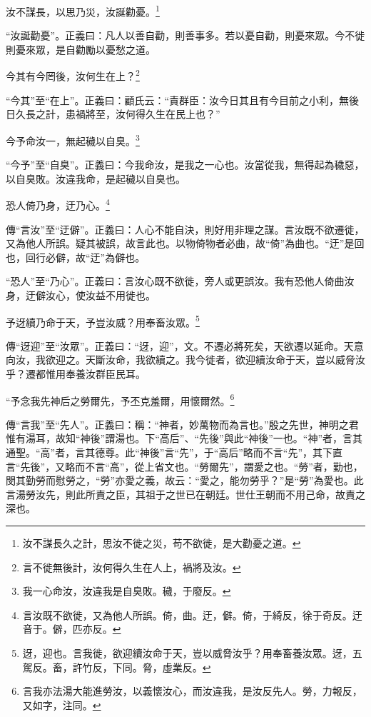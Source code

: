 汝不謀長，以思乃災，汝誕勸憂。\footnote{汝不謀長久之計，思汝不徙之災，苟不欲徙，是大勸憂之道。}

{\noindent\shu{}\fzkt “汝誕勸憂”。正義曰：凡人以善自勸，則善事多。若以憂自勸，則憂來眾。今不徙則憂來眾，是自勸勵以憂愁之道。 \par}

今其有今罔後，汝何生在上？\footnote{言不徙無後計，汝何得久生在人上，禍將及汝。}

{\noindent\shu{}\fzkt “今其”至“在上”。正義曰：顧氏云：“責群臣：汝今日其且有今目前之小利，無後日久長之計，患禍將至，汝何得久生在民上也？” \par}

今予命汝一，無起穢以自臭。\footnote{我一心命汝，汝違我是自臭敗。穢，于廢反。}

{\noindent\shu{}\fzkt “今予”至“自臭”。正義曰：今我命汝，是我之一心也。汝當從我，無得起為穢惡，以自臭敗。汝違我命，是起穢以自臭也。 \par}

恐人倚乃身，迂乃心。\footnote{言汝既不欲徙，又為他人所誤。倚，曲。迂，僻。倚，于綺反，徐于奇反。迂音于。僻，匹亦反。}

{\noindent\zhuan{}\fzbyks 傳“言汝”至“迂僻”。正義曰：人心不能自決，則好用非理之謀。言汝既不欲遷徙，又為他人所誤。疑其被誤，故言此也。以物倚物者必曲，故“倚”為曲也。“迂”是回也，回行必僻，故“迂”為僻也。 \par}

{\noindent\shu{}\fzkt “恐人”至“乃心”。正義曰：言汝心既不欲徙，旁人或更誤汝。我有恐他人倚曲汝身，迂僻汝心，使汝益不用徙也。 \par}

予迓續乃命于天，予豈汝威？用奉畜汝眾。\footnote{迓，迎也。言我徙，欲迎續汝命于天，豈以威脅汝乎？用奉畜養汝眾。迓，五駕反。畜，許竹反，下同。脅，虛業反。}

{\noindent\zhuan{}\fzbyks 傳“迓迎”至“汝眾”。正義曰：“迓，迎”，文。不遷必將死矣，天欲遷以延命。天意向汝，我欲迎之。天斷汝命，我欲續之。我今徙者，欲迎續汝命于天，豈以威脅汝乎？遷都惟用奉養汝群臣民耳。 \par}

“予念我先神后之勞爾先，予丕克羞爾，用懷爾然。\footnote{言我亦法湯大能進勞汝，以義懷汝心，而汝違我，是汝反先人。勞，力報反，又如字，注同。}

{\noindent\zhuan{}\fzbyks 傳“言我”至“先人”。正義曰：稱：“神者，妙萬物而為言也。”殷之先世，神明之君惟有湯耳，故知“神後”謂湯也。下“高后”、“先後”與此“神後”一也。“神”者，言其通聖。“高”者，言其德尊。此“神後”言“先”，于“高后”略而不言“先”，其下直言“先後”，又略而不言“高”，從上省文也。“勞爾先”，謂愛之也。“勞”者，勤也，閔其勤勞而慰勞之，“勞”亦愛之義，故云：“愛之，能勿勞乎？”是“勞”為愛也。此言湯勞汝先，則此所責之臣，其祖于之世已在朝廷。世仕王朝而不用己命，故責之深也。 \par}

